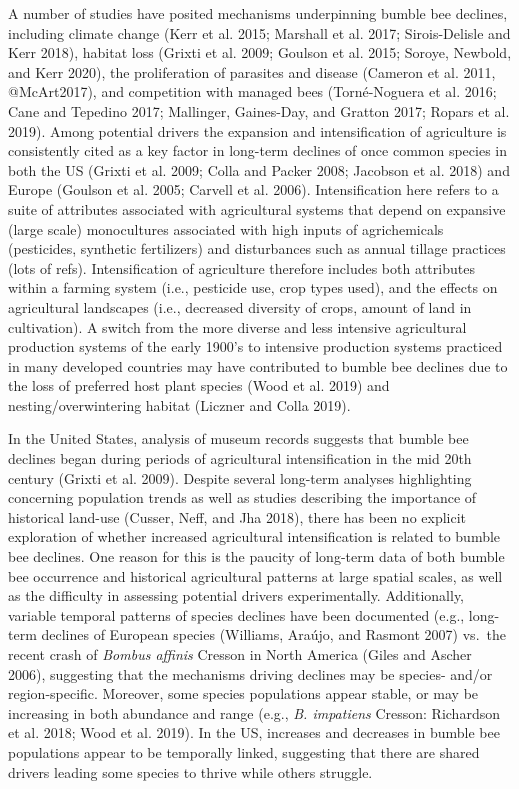 \documentclass[11pt,]{article}
\begin{document}
A number of studies have posited mechanisms underpinning bumble bee
declines, including climate change (Kerr et al. 2015; Marshall et al.
2017; Sirois-Delisle and Kerr 2018), habitat loss (Grixti et al. 2009;
Goulson et al. 2015; Soroye, Newbold, and Kerr 2020), the proliferation
of parasites and disease (Cameron et al. 2011, @McArt2017), and
competition with managed bees (Torné-Noguera et al. 2016; Cane and
Tepedino 2017; Mallinger, Gaines-Day, and Gratton 2017; Ropars et al.
2019). Among potential drivers the expansion and intensification of
agriculture is consistently cited as a key factor in long-term declines
of once common species in both the US (Grixti et al. 2009; Colla and
Packer 2008; Jacobson et al. 2018) and Europe (Goulson et al. 2005;
Carvell et al. 2006). Intensification here refers to a suite of
attributes associated with agricultural systems that depend on expansive
(large scale) monocultures associated with high inputs of agrichemicals
(pesticides, synthetic fertilizers) and disturbances such as annual
tillage practices (lots of refs). Intensification of agriculture
therefore includes both attributes within a farming system (i.e.,
pesticide use, crop types used), and the effects on agricultural
landscapes (i.e., decreased diversity of crops, amount of land in
cultivation). A switch from the more diverse and less intensive
agricultural production systems of the early 1900's to intensive
production systems practiced in many developed countries may have
contributed to bumble bee declines due to the loss of preferred host
plant species (Wood et al. 2019) and nesting/overwintering habitat
(Liczner and Colla 2019).

In the United States, analysis of museum records suggests that bumble
bee declines began during periods of agricultural intensification in the
mid 20th century (Grixti et al. 2009). Despite several long-term
analyses highlighting concerning population trends as well as studies
describing the importance of historical land-use (Cusser, Neff, and Jha
2018), there has been no explicit exploration of whether increased
agricultural intensification is related to bumble bee declines. One
reason for this is the paucity of long-term data of both bumble bee
occurrence and historical agricultural patterns at large spatial scales,
as well as the difficulty in assessing potential drivers experimentally.
Additionally, variable temporal patterns of species declines have been
documented (e.g., long-term declines of European species (Williams,
Araújo, and Rasmont 2007) vs.~the recent crash of \emph{Bombus affinis}
Cresson in North America (Giles and Ascher 2006), suggesting that the
mechanisms driving declines may be species- and/or region-specific.
Moreover, some species populations appear stable, or may be increasing
in both abundance and range (e.g., \emph{B. impatiens} Cresson:
Richardson et al. 2018; Wood et al. 2019). In the US, increases and
decreases in bumble bee populations appear to be temporally linked,
suggesting that there are shared drivers leading some species to thrive
while others struggle.
\end{document}
